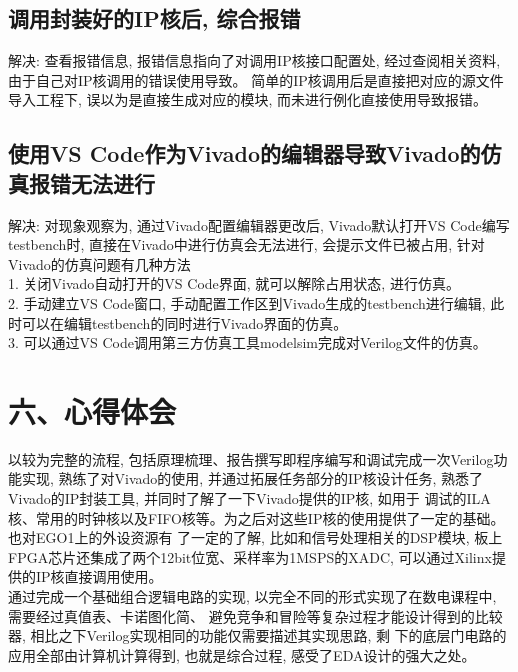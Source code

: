 \documentclass{article}
\newcommand{\fourhao}{\fontsize{14pt}{\baselineskip}\selectfont} %
\newcommand{\xiaosihao}{\fontsize{12pt}{\baselineskip}\selectfont} %
\begin{document}
\subsection*{调用封装好的IP核后, 综合报错}
解决: 查看报错信息, 报错信息指向了对调用IP核接口配置处, 经过查阅相关资料, 由于自己对IP核调用的错误使用导致。
简单的IP核调用后是直接把对应的源文件导入工程下, 误以为是直接生成对应的模块, 而未进行例化直接使用导致报错。
\subsection*{使用VS Code作为Vivado的编辑器导致Vivado的仿真报错无法进行}
解决: 对现象观察为, 通过Vivado配置编辑器更改后, Vivado默认打开VS Code编写testbench时, 直接在Vivado中进行仿真会无法进行, 会提示文件已被占用, 
针对Vivado的仿真问题有几种方法\\
1. 关闭Vivado自动打开的VS Code界面, 就可以解除占用状态, 进行仿真。\\
2. 手动建立VS Code窗口, 手动配置工作区到Vivado生成的testbench进行编辑, 此时可以在编辑testbench的同时进行Vivado界面的仿真。\\
3. 可以通过VS Code调用第三方仿真工具modelsim完成对Verilog文件的仿真。\\
\section*{\fourhao 六、心得体会}
\xiaosihao
以较为完整的流程, 包括原理梳理、报告撰写即程序编写和调试完成一次Verilog功能实现, 熟练了对Vivado的使用, 
并通过拓展任务部分的IP核设计任务, 熟悉了Vivado的IP封装工具, 并同时了解了一下Vivado提供的IP核, 如用于
调试的ILA核、常用的时钟核以及FIFO核等。为之后对这些IP核的使用提供了一定的基础。也对EGO1上的外设资源有
了一定的了解, 比如和信号处理相关的DSP模块, 板上FPGA芯片还集成了两个12bit位宽、采样率为1MSPS的XADC, 
可以通过Xilinx提供的IP核直接调用使用。\\

通过完成一个基础组合逻辑电路的实现, 以完全不同的形式实现了在数电课程中, 需要经过真值表、卡诺图化简、
避免竞争和冒险等复杂过程才能设计得到的比较器, 相比之下Verilog实现相同的功能仅需要描述其实现思路, 剩
下的底层门电路的应用全部由计算机计算得到, 也就是综合过程, 感受了EDA设计的强大之处。
\end{document}
